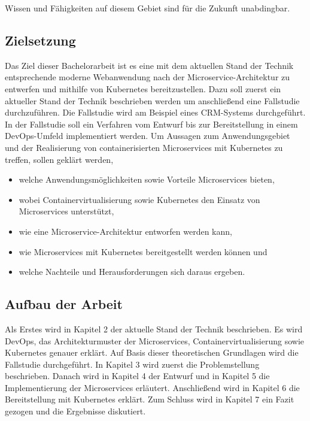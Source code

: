 Wissen und Fähigkeiten auf diesem Gebiet sind für die Zukunft unabdingbar.

\subsection{Zielsetzung}
Das Ziel dieser Bachelorarbeit ist es eine mit dem aktuellen Stand der Technik entsprechende moderne Webanwendung nach der Microservice-Architektur zu entwerfen und mithilfe von Kubernetes bereitzustellen. Dazu soll zuerst ein aktueller Stand der Technik beschrieben werden um anschließend eine Fallstudie durchzuführen. Die Fallstudie wird am Beispiel eines \acp{CRM-System} durchgeführt. In der Fallstudie soll ein Verfahren vom Entwurf bis zur Bereitstellung in einem DevOps-Umfeld implementiert werden. Um Aussagen zum Anwendungsgebiet und der Realisierung von containerisierten Microservices mit Kubernetes zu treffen, sollen geklärt werden, 

\begin{itemize}
\item welche Anwendungsmöglichkeiten sowie Vorteile Microservices bieten,
\item wobei Containervirtualisierung sowie Kubernetes den Einsatz von Microservices unterstützt,
\item wie eine Microservice-Architektur entworfen werden kann,
\item wie Microservices mit Kubernetes bereitgestellt werden können und
\item welche Nachteile und Herausforderungen sich daraus ergeben.
\end{itemize}

\subsection{Aufbau der Arbeit}

Als Erstes wird in Kapitel 2 der aktuelle Stand der Technik beschrieben. Es wird DevOps, das Architekturmuster der Microservices, Containervirtualisierung sowie Kubernetes genauer erklärt. Auf Basis dieser theoretischen Grundlagen wird die Fallstudie durchgeführt. In Kapitel 3 wird zuerst die Problemstellung beschrieben. Danach wird in Kapitel 4 der Entwurf und in Kapitel 5 die Implementierung der Microservices erläutert. Anschließend wird in Kapitel 6 die Bereitstellung mit Kubernetes erklärt. Zum Schluss wird in Kapitel 7 ein Fazit gezogen und die Ergebnisse diskutiert.


